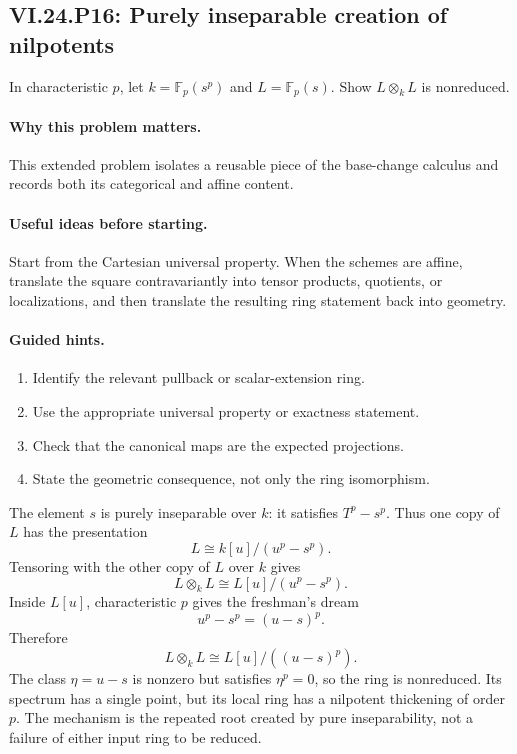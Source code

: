 \subsection*{VI.24.P16: Purely inseparable creation of nilpotents}
\begin{problem}\label{prob:vi24-p16}
In characteristic $p$, let $k=\mathbb F_p(s^p)$ and $L=\mathbb F_p(s)$. Show $L\otimes_kL$ is nonreduced.
\end{problem}

\ifdefined\FullProblemDossiers
\paragraph{Why this problem matters.}
This extended problem isolates a reusable piece of the base-change calculus and records both its categorical and affine content.

\paragraph{Useful ideas before starting.}
Start from the Cartesian universal property.  When the schemes are affine, translate the square contravariantly into tensor products, quotients, or localizations, and then translate the resulting ring statement back into geometry.

\paragraph{Guided hints.}
\begin{enumerate}
\item Identify the relevant pullback or scalar-extension ring.
\item Use the appropriate universal property or exactness statement.
\item Check that the canonical maps are the expected projections.
\item State the geometric consequence, not only the ring isomorphism.
\end{enumerate}

\begin{solution}
The element $s$ is purely inseparable over $k$: it satisfies $T^p-s^p$.  Thus one copy of $L$ has the presentation
\[
L\cong k[u]/(u^p-s^p).
\]
Tensoring with the other copy of $L$ over $k$ gives
\[
L\otimes_kL\cong L[u]/(u^p-s^p).
\]
Inside $L[u]$, characteristic $p$ gives the freshman's dream
\[
u^p-s^p=(u-s)^p.
\]
Therefore
\[
L\otimes_kL\cong L[u]/((u-s)^p).
\]
The class $\eta=u-s$ is nonzero but satisfies $\eta^p=0$, so the ring is nonreduced.  Its spectrum has a single point, but its local ring has a nilpotent thickening of order $p$.  The mechanism is the repeated root created by pure inseparability, not a failure of either input ring to be reduced.
\end{solution}

